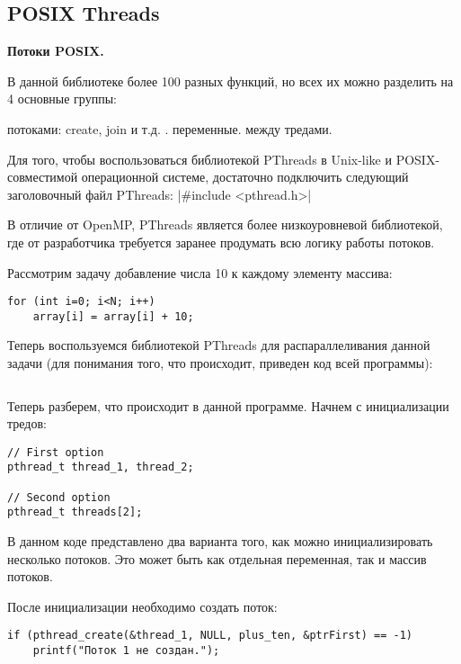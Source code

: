 \subsection{POSIX Threads}
\label{PThreads:section}

\textbf{Потоки POSIX.} 

В данной библиотеке более 100 разных функций, но всех их можно разделить на 4 основные группы:

\begin{itemize}
     потоками: create, join и т.д.
    .
     переменные.
     между тредами.
\end{itemize}

Для того, чтобы воспользоваться библиотекой PThreads в Unix-like и POSIX-совместимой операционной системе, достаточно подключить следующий заголовочный файл PThreads: 
|#include <pthread.h>|

В отличие от OpenMP, PThreads является более низкоуровневой библиотекой, где от разработчика требуется заранее продумать всю логику работы потоков.

Рассмотрим задачу добавление числа 10 к каждому элементу массива:

\begin{verbatim}
for (int i=0; i<N; i++)
    array[i] = array[i] + 10;
\end{verbatim}

Теперь воспользуемся библиотекой PThreads для распараллеливания данной задачи (для понимания того, что происходит, приведен код всей программы):

\inputminted{c++}{listings/WithPosix.c}

Теперь разберем, что происходит в данной программе. Начнем с инициализации тредов:

\begin{verbatim}
// First option
pthread_t thread_1, thread_2;

// Second option
pthread_t threads[2];
\end{verbatim}

В данном коде представлено два варианта того, как можно инициализировать несколько потоков. Это может быть как отдельная переменная, так и массив потоков.

После инициализации необходимо создать поток:

\begin{verbatim}
if (pthread_create(&thread_1, NULL, plus_ten, &ptrFirst) == -1)
    printf("Поток 1 не создан.");
\end{verbatim}

